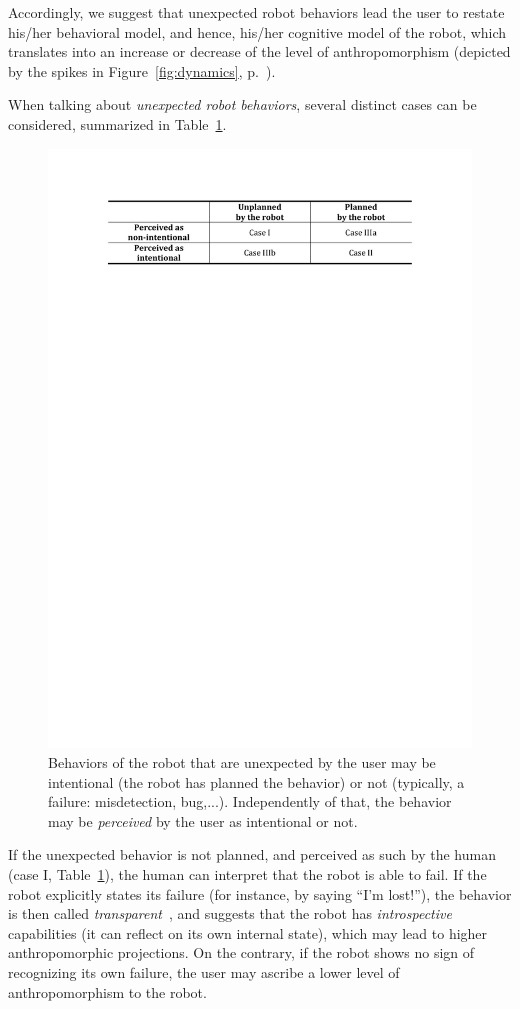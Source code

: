 \documentclass{frontiersSCNS} %
\begin{document}
Accordingly, we suggest that unexpected robot behaviors lead the user to restate
his/her behavioral model, and hence, his/her cognitive model of the robot, which
translates into an increase or decrease of the level of anthropomorphism
(depicted by the spikes in Figure~\ref{fig:dynamics}, p.~\pageref{fig:dynamics}).

When talking about \emph{unexpected robot behaviors}, several distinct cases can
be considered, summarized in Table~\ref{fig:perceptionUnexpectedBehavior}.

\begin{figure}
    \centering
    \includegraphics[width=0.75\columnwidth]{un-expected-behavior.pdf}
    \caption{Behaviors of the robot that are unexpected by the user may be intentional
    (the robot has planned the behavior) or not (typically, a failure:
    misdetection, bug,...). Independently of that, the behavior may be
    \emph{perceived} by the user as intentional or not.}

    \label{fig:perceptionUnexpectedBehavior}
\end{figure}


If the unexpected behavior is not planned, and perceived as such by the human
(case I, Table~\ref{fig:perceptionUnexpectedBehavior}), the human can interpret
that the robot is able to fail. If the robot explicitly states its failure (for
instance, by saying ``I'm lost!''), the behavior is then called
\emph{transparent}~\citep{kim_who_2006}, and suggests that the
robot has \emph{introspective} capabilities (it can reflect on its own internal
state), which may lead to higher anthropomorphic projections.  On the contrary,
if the robot shows no sign of recognizing its own failure, the user may ascribe
a lower level of anthropomorphism to the robot.
\end{document}
